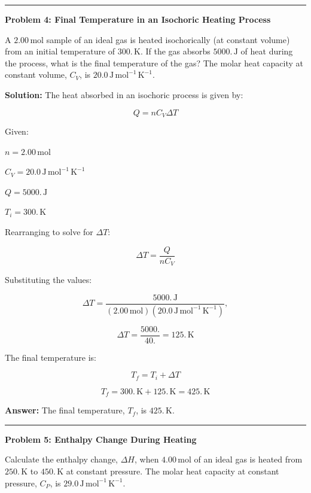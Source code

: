 \documentclass[
  9pt,
]{extbook}
\theoremstyle{definition}
\theoremstyle{definition}
\theoremstyle{definition}
\theoremstyle{definition}
\theoremstyle{remark}
\begin{document}
\begin{center}\rule{0.5\linewidth}{0.5pt}\end{center}

\textbf{Problem 4: Final Temperature in an Isochoric Heating Process}

A \(2.00 \, \text{mol}\) sample of an ideal gas is heated isochorically (at constant volume) from an initial temperature of \(300. \, \text{K}\). If the gas absorbs \(5000. \, \text{J}\) of heat during the process, what is the final temperature of the gas? The molar heat capacity at constant volume, \(C_V\), is \(20.0 \, \text{J} \, \text{mol}^{-1} \, \text{K}^{-1}\).

\textbf{Solution:} The heat absorbed in an isochoric process is given by:

\[ Q = n C_V \Delta T \]

Given:

\(n = 2.00 \, \text{mol}\)

\(C_V = 20.0 \, \text{J} \, \text{mol}^{-1} \, \text{K}^{-1}\)

\(Q = 5000. \, \text{J}\)

\(T_i = 300. \, \text{K}\)

Rearranging to solve for \(\Delta T\):

\[ \Delta T = \frac{Q}{n C_V} \]

Substituting the values:

\[ \Delta T = \frac{5000. \, \text{J}}{(2.00\,\text{mol}) (20.0 \, \text{J} \, \text{mol}^{-1} \, \text{K}^{-1})},\]

\[ \Delta T = \frac{5000.}{40.} = 125. \, \text{K} \]

The final temperature is:

\[ T_f = T_i + \Delta T \]

\[ T_f = 300. \, \text{K} + 125. \, \text{K} = 425. \, \text{K} \]

\textbf{Answer:} The final temperature, \(T_f\), is \(425. \, \text{K}\).

\begin{center}\rule{0.5\linewidth}{0.5pt}\end{center}

\textbf{Problem 5: Enthalpy Change During Heating}

Calculate the enthalpy change, \(\Delta H\), when \(4.00 \, \text{mol}\) of an ideal gas is heated from \(250. \, \text{K}\) to \(450. \, \text{K}\) at constant pressure. The molar heat capacity at constant pressure, \(C_P\), is \(29.0 \, \text{J} \, \text{mol}^{-1} \, \text{K}^{-1}\).
\end{document}
